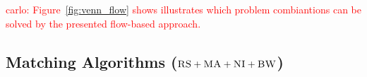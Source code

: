 \documentclass[9pt,twocolumn]{scrartcl}
\newcommand{\VM}{\textsc{VM}}
\newcommand{\Problem}{\textsc{DummyName Problem}}
\newcommand{\carlo}[1]{\textcolor{red}{carlo: #1}}
\newcommand{\ChunkType}{\tau}
\newcommand{\achunk}{\ensuremath{c}}
\newcommand{\CC}{\textsc{NI}}
\newcommand{\RS}{\textsc{RS}}
\newcommand{\BW}{\textsc{BW}}
\newcommand{\MA}{\textsc{MA}}
\begin{document}
\carlo{Figure~\ref{fig:venn_flow} shows illustrates which problem
combiantions can be solved by the presented flow-based approach.}

\subsection{Matching Algorithms ($\RS+\MA+\CC+\BW$)}
\end{document}

